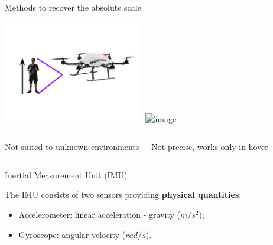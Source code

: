 \documentclass{beamer}
\begin{document}


\begin{frame}{Methods to recover the absolute scale}


  \includegraphics[width=0.45\textwidth]{images/referenceInEnv.png}~
  \includegraphics<2->[width=0.45\textwidth]{images/altitudeSensor.png}

  \begin{columns}[T] %
    \centering
    Not suited to unknown environments

    \centering
    Not precise, works only in hover


\end{columns}

\end{frame}

\begin{frame}{Inertial Measurement Unit (IMU)}

The IMU consists of two sensors providing \textbf{physical quantities}:
\begin{itemize}
\item Accelerometer: linear acceleration - gravity ($m/s^2$);
\item Gyroscope: angular velocity ($rad/s$).
\end{itemize}

\end{frame}
\end{document}
